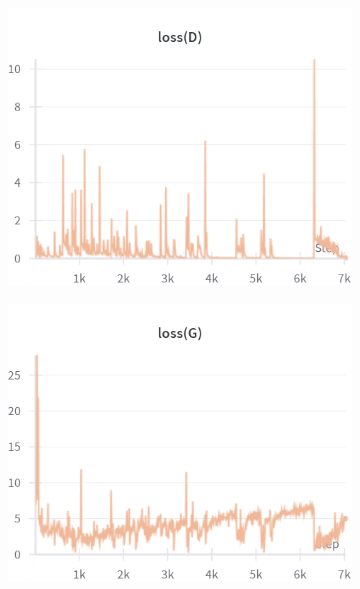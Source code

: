 \begin{figure}[H]
    \centering

    \begin{subfigure}{0.45\textwidth}
        \centering
        \includegraphics[width=0.95\linewidth]{ndf/128/lossD.png}
        \caption{}
        \label{subfig:ndf/128/lossD}
    \end{subfigure}%
    \begin{subfigure}{0.45\textwidth}
        \centering
        \includegraphics[width=0.95\linewidth]{ndf/128/lossG.png}
        \caption{}
        \label{subfig:ndf/128/lossG}
    \end{subfigure}


\end{figure}
